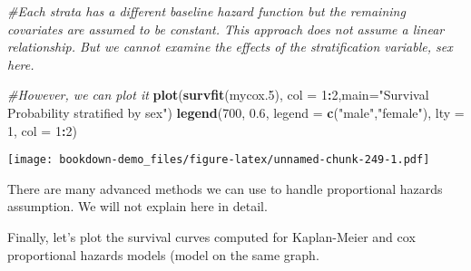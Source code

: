 \documentclass[]{book}
\newenvironment{Shaded}{\begin{snugshade}}{\end{snugshade}}
\newcommand{\KeywordTok}[1]{\textcolor[rgb]{0.13,0.29,0.53}{\textbf{#1}}}
\newcommand{\DataTypeTok}[1]{\textcolor[rgb]{0.13,0.29,0.53}{#1}}
\newcommand{\DecValTok}[1]{\textcolor[rgb]{0.00,0.00,0.81}{#1}}
\newcommand{\FloatTok}[1]{\textcolor[rgb]{0.00,0.00,0.81}{#1}}
\newcommand{\StringTok}[1]{\textcolor[rgb]{0.31,0.60,0.02}{#1}}
\newcommand{\CommentTok}[1]{\textcolor[rgb]{0.56,0.35,0.01}{\textit{#1}}}
\newcommand{\OperatorTok}[1]{\textcolor[rgb]{0.81,0.36,0.00}{\textbf{#1}}}
\newcommand{\NormalTok}[1]{#1}
\theoremstyle{definition}
\theoremstyle{definition}
\theoremstyle{definition}
\theoremstyle{remark}
\begin{document}
\begin{Shaded}
\begin{Highlighting}[]
\CommentTok{#Each strata has a different baseline hazard function but the remaining covariates are assumed to be constant. This approach does not assume a linear relationship. But we cannot examine the effects of the stratification variable, sex here.}

\CommentTok{#However, we can plot it}
\KeywordTok{plot}\NormalTok{(}\KeywordTok{survfit}\NormalTok{(mycox.}\DecValTok{5}\NormalTok{), }\DataTypeTok{col =} \DecValTok{1}\OperatorTok{:}\DecValTok{2}\NormalTok{,}\DataTypeTok{main=}\StringTok{"Survival Probability stratified by sex"}\NormalTok{)}
\KeywordTok{legend}\NormalTok{(}\DecValTok{700}\NormalTok{, }\FloatTok{0.6}\NormalTok{, }\DataTypeTok{legend =} \KeywordTok{c}\NormalTok{(}\StringTok{"male"}\NormalTok{,}\StringTok{"female"}\NormalTok{), }\DataTypeTok{lty =} \DecValTok{1}\NormalTok{, }\DataTypeTok{col =} \DecValTok{1}\OperatorTok{:}\DecValTok{2}\NormalTok{)}
\end{Highlighting}
\end{Shaded}

\texttt{[image: bookdown-demo\_files/figure-latex/unnamed-chunk-249-1.pdf]}

There are many advanced methods we can use to handle proportional
hazards assumption. We will not explain here in detail.

Finally, let's plot the survival curves computed for Kaplan-Meier and
cox proportional hazards models (model on the same graph.
\end{document}
